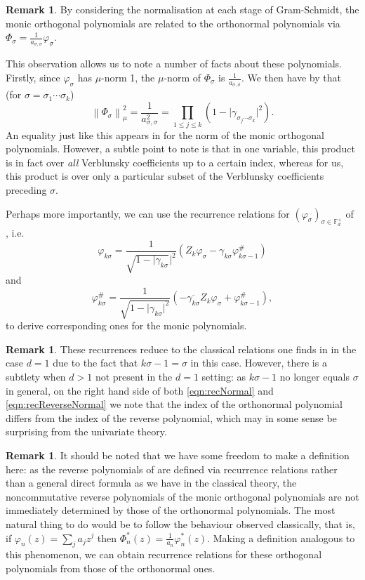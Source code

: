 \documentclass[11pt,reqno]{amsart}
\newcommand\norm[1]{\left\lVert#1\right\rVert}
\def\p{\varphi}
\def\g{\gamma}
\def\s{\sigma}
\def\P{\Phi}
\def\FF{\mathbb{F}}
\theoremstyle{definition}
\newtheorem{remark}[theorem]{Remark}
\numberwithin{equation}{section}
\begin{document}
\begin{remark}
    By considering the normalisation at each stage of Gram-Schmidt, the monic orthogonal polynomials are related to the orthonormal polynomials via \(\P_\s = \frac{1}{a_{\s,\s}}\p_\s\).
\end{remark} 

This observation allows us to note a number of facts about these polynomials. Firstly, since \(\p_\s\) has \(\mu\)-norm 1, the \(\mu\)-norm of \(\P_\s\) is \(\frac{1}{a_{\s,\s}}\). We then have by \cite[Theorem 3.1(2)]{CJ02b} that (for \(\s = \s_1 \cdots \s_k\))
\[
    \norm{\P_\s}^2_\mu = \frac{1}{a_{\s,\s}^2} = \prod_{1 \leq j \leq k} (1 - \lvert \g_{\s_j \cdots \s_k} \rvert^2).
\]
An equality just like this appears in \cite{Sim05} for the norm of the monic orthogonal polynomials. However, a subtle point to note is that in one variable, this product is in fact over \emph{all} Verblunsky coefficients up to a certain index, whereas for us, this product is over only a particular subset of the Verblunsky coefficients preceding \(\s\).

Perhaps more importantly, we can use the recurrence relations for \((\p_\s)_{\s \in \FF_d^+}\) of \cite[Theorem 3.2]{CJ02b}, i.e.
\begin{equation}
    \label{eqn:recNormal}
    \p_{k\s} = \frac{1}{\sqrt{1 - \lvert \g_{k\s}} \rvert^2}(Z_k\p_\s - \g_{k\s} \p_{k\s - 1}^{\#})
\end{equation}
and
\begin{equation}
    \label{eqn:recReverseNormal}
    \p_{k\s}^{\#} = \frac{1}{\sqrt{1 - \lvert \g_{k\s}\rvert^2}}(-\overline{\g_{k\s}} Z_k \p_\s + \p_{k\s-1}^{\#}),
\end{equation}
to derive corresponding ones for the monic polynomials.

\begin{remark}
    These recurrences reduce to the classical relations one finds in \cite{Sim05} in the case \(d = 1\) due to the fact that \(k\s - 1 = \s\) in this case. However, there is a subtlety when \(d > 1\) not present in the \(d = 1\) setting: as \(k\s - 1\) no longer equals \(\s\) in general, on the right hand side of both \eqref{eqn:recNormal} and \eqref{eqn:recReverseNormal} we note that the index of the orthonormal polynomial differs from the index of the reverse polynomial, which may in some sense be surprising from the univariate theory.
\end{remark}

\begin{remark}
    It should be noted that we have some freedom to make a definition here: as the reverse polynomials of \cite{CJ02b} are defined via recurrence relations rather than a general direct formula as we have in the classical theory, the noncommutative reverse polynomials of the monic orthogonal polynomials are not immediately determined by those of the orthonormal polynomials. The most natural thing to do would be to follow the behaviour observed classically, that is, if \(\p_n(z) = \sum_j a_j z^j\) then \(\P^*_n(z) = \frac{1}{a_n}\p^*_n(z)\). Making a definition analogous to this phenomenon, we can obtain recurrence relations for these orthogonal polynomials from those of the orthonormal ones.
\end{remark}
\end{document}
